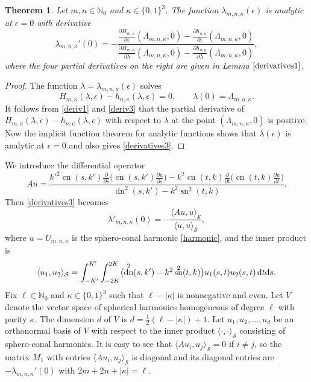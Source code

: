 \documentclass[pdftex]{sigma}
\newtheorem{thm}{Theorem}[section]
\newcommand{\N}{\mathbb{N}}
\newcommand{\Sp}{\mathcal{S}}
\DeclareMathOperator{\sn}{sn}
\DeclareMathOperator{\cn}{cn}
\DeclareMathOperator{\dn}{dn}
\numberwithin{equation}{section}
\begin{document}
\begin{thm}%
Let $m,n\in\N_0$ and $\kappa\in\{0,1\}^3$. The function $\lambda_{m,n,\kappa}(\epsilon)$ is analytic at $\epsilon=0$
with derivative
\begin{equation}\label{derivatives3}
 \lambda_{m,n,\kappa}'(0)=
-\frac{ \frac{\partial H_{m,\kappa}}{\partial \epsilon}(\Lambda_{m,n,\kappa},0)-\frac{\partial h_{n,\kappa}}{\partial \epsilon}(\Lambda_{m,n,\kappa},0)}{ \frac{\partial H_{m,\kappa}}{\partial \lambda}(\Lambda_{m,n,\kappa},0)-\frac{\partial h_{n,\kappa}}{\partial \lambda}(\Lambda_{m,n,\kappa},0)},
\end{equation}
where the four partial derivatives on the right are given in Lemma $\ref{derivatives1}$.
\end{thm}
\begin{proof}
The function $\lambda=\lambda_{m,n,\kappa}(\epsilon)$ solves
\[ H_{m,\kappa}(\lambda,\epsilon)-h_{n,\kappa}(\lambda,\epsilon) =0,\qquad \lambda(0)=\Lambda_{m,n,\kappa}.\]
It follows from \eqref{deriv1} and \eqref{deriv3} that the partial derivative of $H_{m,\kappa}(\lambda,\epsilon)-h_{n,\kappa}(\lambda,\epsilon)$ with respect to $\lambda$ at the point $(\Lambda_{m,n,\kappa},0)$ is positive.
Now the implicit function theorem for analytic functions shows that $\lambda(\epsilon)$ is analytic at $\epsilon=0$ and
also gives \eqref{derivatives3}.
\end{proof}

We introduce the differential operator
\[ Au=\frac{k'^2\cn(s,k')\frac{\partial}{\partial s}\bigl( \cn(s,k')\frac{\partial u}{\partial s}\bigr)-k^2\cn(t,k)\frac{\partial}{\partial t}\bigl( \cn(t,k)\frac{\partial u}{\partial t}\bigr)}
{\dn^2(s,k')-k^2\sn^2(t,k)}.
\]
Then \eqref{derivatives3} becomes
\[ \lambda'_{m,n,\kappa}(0)=-\frac{\langle Au,u\rangle_\Sp}{\langle u,u\rangle_\Sp},\]
where $u=U_{m,n,\kappa}$ is the sphero-conal harmonic \eqref{harmonic}, and
the inner product is
\[ \langle u_1,u_2\rangle_\Sp =\int_{-K'}^{K'}\int_{-2K}^{2K} \bigl(\dn^2(s,k')-k^2\sn^2(t,k)\bigr)u_1(s,t)u_2(s,t)\,{\rm d}t{\rm d}s.\]
Fix $\ell\in\N_0$ and $\kappa\in\{0,1\}^3$ such that $\ell-|\kappa|$ is nonnegative and even.
Let $V$ denote the vector space of spherical
harmonics homogeneous of degree $\ell$ with parity $\kappa$. The dimension $d$ of $V$ is $d=\frac12(\ell-|\kappa|)+1$.
Let $u_1,u_2,\dots,u_d$ be an orthonormal basis of $V$ with respect to the inner product $\langle\cdot,\cdot\rangle_\Sp$
consisting of sphero-conal harmonics.
It is easy to see that $\langle Au_i,u_j\rangle_\Sp=0$ if $i\ne j$, so the matrix $M_1$ with entries
$\langle Au_i,u_j\rangle_\Sp$ is diagonal and its diagonal entries are
$-\lambda_{m,n,\kappa}'(0)$ with $2m+2n+|\kappa|=\ell$.
\end{document}
